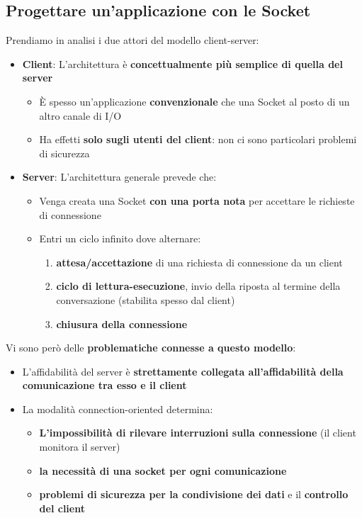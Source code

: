 \documentclass[12pt]{article}
\begin{document}
\subsection{Progettare un'applicazione con le Socket}
Prendiamo in analisi i due attori del modello client-server:
\begin{itemize}
    \item \textbf{Client}: L'architettura è \textbf{concettualmente più semplice di quella del server}
          \begin{itemize}
              \item È spesso un'applicazione \textbf{convenzionale} che una Socket al posto di un altro canale di I/O
              \item Ha effetti \textbf{solo sugli utenti del client}: non ci sono particolari problemi di sicurezza
          \end{itemize}
    \item \textbf{Server}: L'architettura generale prevede che:
          \begin{itemize}
              \item Venga creata una Socket \textbf{con una porta nota} per accettare le richieste di connessione
              \item Entri un ciclo infinito dove alternare:
                    \begin{enumerate}
                        \item \textbf{attesa/accettazione} di una richiesta di connessione da un client
                        \item \textbf{ciclo di lettura-esecuzione}, invio della riposta al termine della conversazione (stabilita spesso dal client)
                        \item \textbf{chiusura della connessione}
                    \end{enumerate}
          \end{itemize}
\end{itemize}
Vi sono però delle \textbf{problematiche connesse a questo modello}:
\begin{itemize}
    \item L'affidabilità del server è \textbf{strettamente collegata all'affidabilità della comunicazione tra esso e il client}
    \item La modalità connection-oriented determina:
          \begin{itemize}
              \item \textbf{L'impossibilità di rilevare interruzioni sulla connessione} (il client monitora il server)
              \item \textbf{la necessità di una socket per ogni comunicazione}
              \item \textbf{problemi di sicurezza per la condivisione dei dati} e il \textbf{controllo del client}
          \end{itemize}
\end{itemize}
\end{document}
